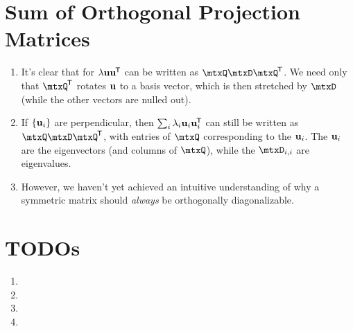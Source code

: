 \documentclass[11pt, oneside]{amsart}
\begin{document}
\section{Sum of Orthogonal Projection Matrices}

\begin{enumerate}
  \item It's clear that for $\lambda \bm{\mathrm{u}}\bm{\mathrm{u}}^{\mkern-1.5mu\mathsf{T}}$ can be written as
  $\mtxQ\mtxD\mtxQ\tran$. We need only that $\mtxQ\tran$ rotates $\bm{\mathrm{u}}$
  to a basis vector, which is then stretched by $\mtxD$ (while the other
  vectors are nulled out).

  \item If $\left\{ \bm{\mathrm{u}}_i \right\}$ are perpendicular, then $\sum_i \lambda_i
  \bm{\mathrm{u}}_i \bm{\mathrm{u}}_i^{\mkern-1.5mu\mathsf{T}}$ can still be written as $\mtxQ\mtxD\mtxQ\tran$, with
  entries of $\mtxQ$ corresponding to the $\bm{\mathrm{u}}_i$. The $\bm{\mathrm{u}}_i$ are the
  eigenvectors (and columns of $\mtxQ$), while the $\mtxD_{i, i}$ are
  eigenvalues.

  \item However, we haven't yet achieved an intuitive understanding of
  why a symmetric matrix should \emph{always} be orthogonally
  diagonalizable.
\end{enumerate}

\section{TODOs}

\begin{enumerate}
  \item {}

  \item {}

  \item {}

  \item {}
\end{enumerate}
\end{document}

